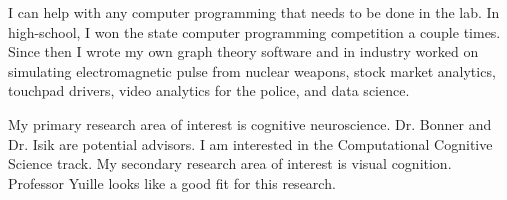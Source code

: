 \documentclass{article}
\begin{document}
I can help with any computer programming that needs to be done in the lab. In high-school, I won the state computer programming competition a couple times. Since then I wrote my own graph theory software and in industry worked on simulating electromagnetic pulse from nuclear weapons, stock market analytics, touchpad drivers, video analytics for the police, and data science. 

My primary research area of interest is cognitive neuroscience. Dr. Bonner and Dr. Isik are potential advisors.  I am interested in the Computational Cognitive Science track.
My secondary research area of interest is visual cognition.  Professor Yuille looks like a good fit for this research.
\end{document}
